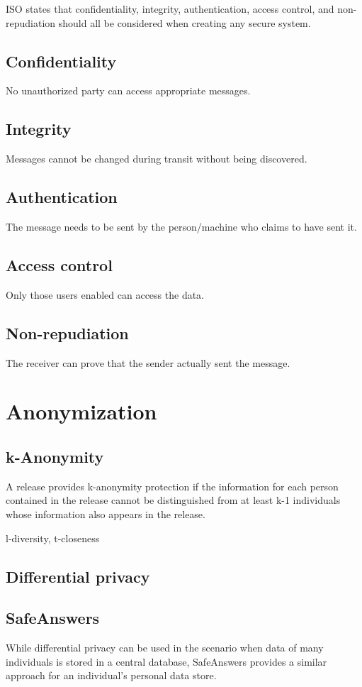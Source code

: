 \documentclass[journal]{IEEEtran}
\begin{document}
ISO states that confidentiality, integrity, authentication, access control, and non-repudiation should all be considered when creating any secure system.

\subsection{Confidentiality}
No unauthorized party can access appropriate messages.
\subsection{Integrity}
Messages cannot be changed during transit without being discovered.
\subsection{Authentication}
The message needs to be sent by the person/machine who claims to have sent it.
\subsection{Access control}
Only those users enabled can access the data.
\subsection{Non-repudiation}
The receiver can prove that the sender actually sent the message.

\section{Anonymization}

\subsection{k-Anonymity}
\cite{Sweeney:2002}
A release provides k-anonymity protection if the information for each person contained in the release cannot be distinguished from at least k-1 individuals whose information also appears in the release.

l-diversity\cite{Machanavajjhala:2007:LDP:1217299.1217302}, t-closeness\cite{Li:2007}

\subsection{Differential privacy}
\cite{Dwork2006}

\subsection{SafeAnswers}
\cite{10.1371/journal.pone.0098790}
While differential privacy can be used in the scenario when data of many individuals is stored in a central database, SafeAnswers provides a similar approach for an individual's personal data store.
\end{document}
